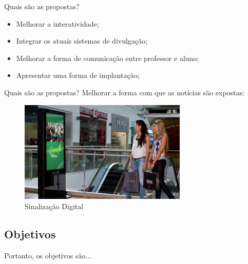 \documentclass{aula-ifb}
\begin{document}
\begin{frame}{Quais são as propostas?}
\begin{itemize}
   \item Melhorar a interatividade;
   \vspace{10px}
   \item Integrar os atuais sistemas de divulgação;
   \vspace{10px}
   \item Melhorar a forma de comunicação entre professor e aluno;
   \vspace{10px}
   \item Apresentar uma forma de implantação;
\end{itemize}
\end{frame}

\begin{frame}{Quais são as propostas?}
Melhorar a forma com que as notícias são expostas:
\begin{figure}[h]
\includegraphics[width=8cm]{figuras/sinalizacao.png}
\caption{Sinalização Digital}
\label{fig:siteifb}
\end{figure}
\end{frame}

\subsection{Objetivos}
\begin{frame}{Portanto, os objetivos são...}

\end{frame}
\end{document}

